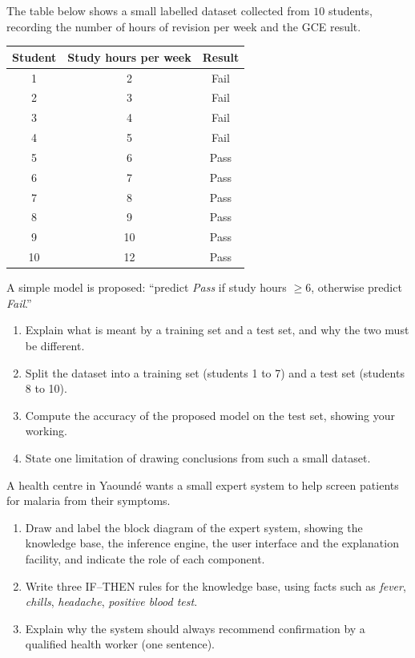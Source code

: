 \documentclass[11pt]{article}
\newcommand{\cle}[1]{{\popxbold\color{popdark}#1}}
\begin{document}
\begin{exercice}
The table below shows a small labelled dataset collected from $10$ students, recording the number of hours of revision per week and the GCE result.

\begin{center}
\begin{tabular}{|c|c|c|}
\hline
\rowcolor{popblueL} Student & Study hours per week & Result \\
\hline
1 & 2 & Fail \\ \hline
2 & 3 & Fail \\ \hline
3 & 4 & Fail \\ \hline
4 & 5 & Fail \\ \hline
5 & 6 & Pass \\ \hline
6 & 7 & Pass \\ \hline
7 & 8 & Pass \\ \hline
8 & 9 & Pass \\ \hline
9 & 10 & Pass \\ \hline
10 & 12 & Pass \\ \hline
\end{tabular}
\end{center}

A simple model is proposed: ``predict \emph{Pass} if study hours $\geq 6$, otherwise predict \emph{Fail}.''
\begin{enumerate}
\item Explain what is meant by a \cle{training set} and a \cle{test set}, and why the two must be different.
\item Split the dataset into a training set (students 1 to 7) and a test set (students 8 to 10).
\item Compute the accuracy of the proposed model on the test set, showing your working.
\item State one limitation of drawing conclusions from such a small dataset.
\end{enumerate}
\end{exercice}

\begin{exercice}
A health centre in Yaoundé wants a small expert system to help screen patients for malaria from their symptoms.
\begin{enumerate}
\item Draw and label the block diagram of the expert system, showing the knowledge base, the inference engine, the user interface and the explanation facility, and indicate the role of each component.
\item Write three IF--THEN rules for the knowledge base, using facts such as \emph{fever}, \emph{chills}, \emph{headache}, \emph{positive blood test}.
\item Explain why the system should always recommend confirmation by a qualified health worker (one sentence).
\end{enumerate}
\end{exercice}
\end{document}
